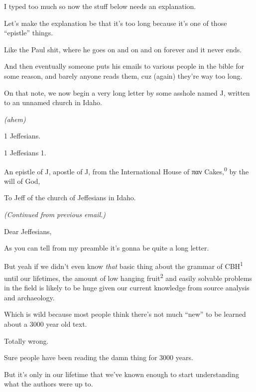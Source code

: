
\Sentence
{ \hX{} }
{ \eX{} }
{
    I typed too much so now the stuff below needs an explanation.

    Let's make the explanation be that it's too long because it's one of those ``epistle'' things.

    Like the Paul shit, where he goes on and on and on forever and it never ends.

    And then eventually someone puts his emails to various people in the bible for some reason, and barely anyone reads them, cuz (again) they're way too long.
}

\Sentence
{ \hX{} }
{ \eX{} }
{
    On that note, we now begin a very long letter by some asshole named J, written to an unnamed church in Idaho.

    \emph{(ahem)}
}

\Sentence
{ \hX{} }
{ \eX{} }
{
    1 Jeffesians.

    1 Jeffesians 1.

    An epistle of J, apostle of J, from the International House of παν Cakes,\textsuperscript{0} by the will of God,

    To Jeff of the church of Jeffesians in Idaho.

    \emph{(Continued from previous email.)}
}

\Sentence
{ \hX{} }
{ \eX{} }
{
    Dear Jeffesians,

    As you can tell from my preamble it's gonna be quite a long letter.
}

\Sentence
{ \hX{} }
{ \eX{} }
{
    But yeah if we didn't even know \emph{that} basic thing about the grammar of CBH\textsuperscript{1} until our lifetimes, the amount of low hanging fruit\textsuperscript{2} and easily solvable problems in the field is likely to be huge given our current knowledge from source analysis and archaeology.
}

\Sentence
{ \hX{} }
{ \eX{} }
{
    Which is wild because most people think there's not much ``new'' to be learned about a 3000 year old text.

    Totally wrong.

    Sure people have been reading the damn thing for 3000 years.

    But it's only in our lifetime that we've known enough to start understanding what the authors were up to.
}


